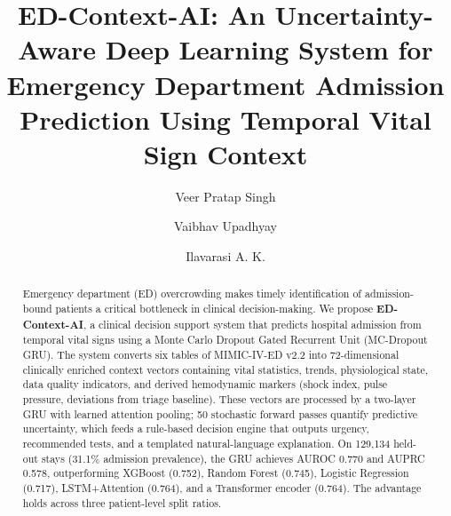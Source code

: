 \documentclass[runningheads]{llncs}
\begin{document}
\title{ED-Context-AI: An Uncertainty-Aware Deep Learning System for Emergency Department Admission Prediction Using Temporal Vital Sign Context}


\author{Veer Pratap Singh \and
Vaibhav Upadhyay \and
Ilavarasi A. K.}



\maketitle

\begin{abstract}
Emergency department (ED) overcrowding makes timely identification of admission-bound patients a critical bottleneck in clinical decision-making. We propose \textbf{ED-Context-AI}, a clinical decision support system that predicts hospital admission from temporal vital signs using a Monte Carlo Dropout Gated Recurrent Unit (MC-Dropout GRU). The system converts six tables of MIMIC-IV-ED v2.2 into 72-dimensional clinically enriched context vectors containing vital statistics, trends, physiological state, data quality indicators, and derived hemodynamic markers (shock index, pulse pressure, deviations from triage baseline). These vectors are processed by a two-layer GRU with learned attention pooling; 50 stochastic forward passes quantify predictive uncertainty, which feeds a rule-based decision engine that outputs urgency, recommended tests, and a templated natural-language explanation. On 129{,}134 held-out stays (31.1\% admission prevalence), the GRU achieves AUROC 0.770 and AUPRC 0.578, outperforming XGBoost (0.752), Random Forest (0.745), Logistic Regression (0.717), LSTM+Attention (0.764), and a Transformer encoder (0.764). The advantage holds across three patient-level split ratios.
\end{abstract}
\end{document}
